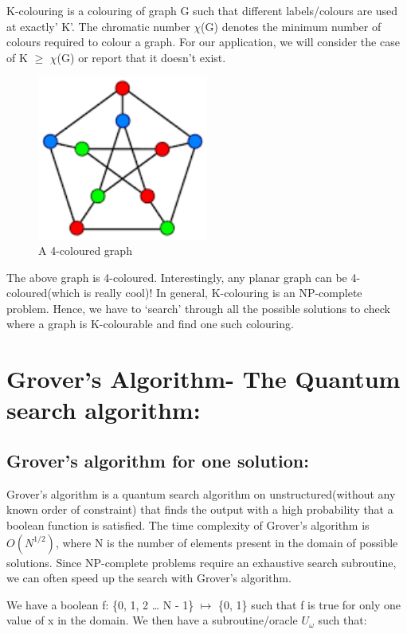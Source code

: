 \documentclass{article}
\begin{document}
K-colouring is a colouring of graph G such that different labels/colours are used at exactly' K'. The chromatic number $\chi$(G) denotes the minimum number of colours required to colour a graph. For our application, we will consider the case of K $\geq$ $\chi$(G) or report that it doesn’t exist.

\begin{figure}[h]
  \centering
\includegraphics[width=0.5\textwidth]{graph2.png}
  \caption{A 4-coloured graph}
  \label{fig:Coloured graph}
\end{figure}

The above graph is 4-coloured. Interestingly,  any planar graph can be 4-coloured(which is really cool)! In general, K-colouring is an NP-complete problem. Hence, we have to ‘search’ through all the possible solutions to check where a graph is K-colourable and find one such colouring.

\section{Grover’s Algorithm- The Quantum search algorithm:
}

\subsection{Grover's algorithm for one solution:}

Grover’s algorithm is a quantum search algorithm on unstructured(without any known order of constraint) that finds the output with a high probability that a boolean function is satisfied. The time complexity of Grover’s algorithm is $O(N^{1/2})$, where N is the number of elements present in the domain of possible solutions. Since NP-complete problems require an exhaustive search subroutine, we can often speed up the search with Grover’s algorithm.

We have a boolean f: \{0, 1, 2 … N - 1\} $\mapsto$ \{0, 1\} such that f is true for only one value of x in the domain. We then have a subroutine/oracle $U_\omega$ such that:
\end{document}
